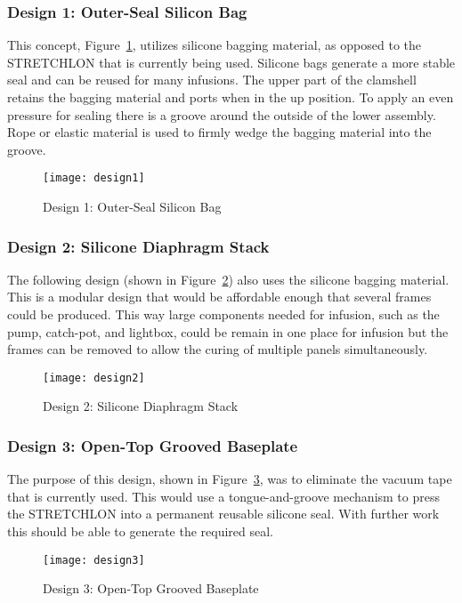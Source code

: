 \documentclass[12pt,letterpaper,notitlepage]{article}
\begin{document}
\subsubsection{Design 1: Outer-Seal Silicon Bag}
This concept, Figure~\ref{fig:design1}, utilizes silicone bagging material, as opposed to the STRETCHLON that is currently being used. Silicone bags generate a more stable seal and can be reused for many infusions. The upper part of the clamshell retains the bagging material and ports when in the up position. To apply an even pressure for sealing there is a groove around the outside of the lower assembly. Rope or elastic material is used to firmly wedge the bagging material into the groove.
\begin{figure}[H]
\centering
\texttt{[image: design1]}
\caption{Design 1: Outer-Seal Silicon Bag}
\label{fig:design1}
\end{figure}
\subsubsection{Design 2: Silicone Diaphragm Stack}
The following design (shown in Figure~\ref{fig:design2}) also uses the silicone bagging material. This is a modular design that would be affordable enough that several frames could be produced. This way large components needed for infusion, such as the pump, catch-pot, and lightbox, could be remain in one place for infusion but the frames can be removed to allow the curing of multiple panels simultaneously.
\begin{figure}[H]
\centering
\texttt{[image: design2]}
\caption{Design 2: Silicone Diaphragm Stack}
\label{fig:design2}
\end{figure}
\subsubsection{Design 3: Open-Top Grooved Baseplate}
The purpose of this design, shown in Figure~\ref{fig:design3}, was to eliminate the vacuum tape that is currently used. This would use a tongue-and-groove mechanism to press the STRETCHLON into a permanent reusable silicone seal. With further work this should be able to generate the required seal.
\begin{figure}[H]
\centering
\texttt{[image: design3]}
\caption{Design 3: Open-Top Grooved Baseplate}
\label{fig:design3}
\end{figure}
\end{document}

